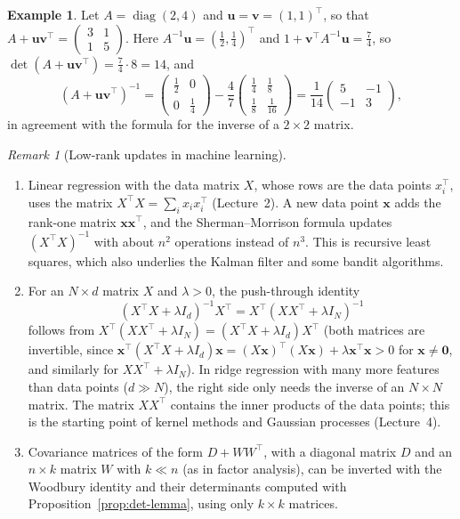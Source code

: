 \documentclass[11pt]{article}
\theoremstyle{definition}
\newtheorem{example}[definition]{Example}
\theoremstyle{plain}
\theoremstyle{remark}
\newtheorem{remark}[definition]{Remark}
\DeclareMathOperator{\diag}{diag}
\begin{document}
\begin{example}\label{ex:sherman-morrison}
    Let $A = \diag(2, 4)$ and $\mathbf{u} = \mathbf{v} = (1, 1)^\top$, so that $A + \mathbf{u}\mathbf{v}^\top = \begin{pmatrix} 3 & 1 \\ 1 & 5 \end{pmatrix}$. Here $A^{-1}\mathbf{u} = (\frac{1}{2}, \frac{1}{4})^\top$ and $1 + \mathbf{v}^\top A^{-1}\mathbf{u} = \frac{7}{4}$, so $\det(A + \mathbf{u}\mathbf{v}^\top) = \frac{7}{4} \cdot 8 = 14$, and
    \[(A + \mathbf{u}\mathbf{v}^\top)^{-1} = \begin{pmatrix} \frac{1}{2} & 0 \\ 0 & \frac{1}{4} \end{pmatrix} - \frac{4}{7}\begin{pmatrix} \frac{1}{4} & \frac{1}{8} \\ \frac{1}{8} & \frac{1}{16} \end{pmatrix} = \frac{1}{14}\begin{pmatrix} 5 & -1 \\ -1 & 3 \end{pmatrix},\]
    in agreement with the formula for the inverse of a $2 \times 2$ matrix.
\end{example}

\begin{remark}[Low-rank updates in machine learning]
    \begin{enumerate}
        \item Linear regression with the data matrix $X$, whose rows are the data points $x_i^\top$, uses the matrix $X^\top X = \sum_i x_ix_i^\top$ (Lecture~2). A new data point $\mathbf{x}$ adds the rank-one matrix $\mathbf{x}\mathbf{x}^\top$, and the Sherman--Morrison formula updates $(X^\top X)^{-1}$ with about $n^2$ operations instead of $n^3$. This is recursive least squares, which also underlies the Kalman filter and some bandit algorithms.
        \item For an $N \times d$ matrix $X$ and $\lambda > 0$, the push-through identity
        \[(X^\top X + \lambda I_d)^{-1}X^\top = X^\top(XX^\top + \lambda I_N)^{-1}\]
        follows from $X^\top(XX^\top + \lambda I_N) = (X^\top X + \lambda I_d)X^\top$ (both matrices are invertible, since $\mathbf{x}^\top(X^\top X + \lambda I_d)\mathbf{x} = (X\mathbf{x})^\top(X\mathbf{x}) + \lambda \mathbf{x}^\top \mathbf{x} > 0$ for $\mathbf{x} \neq \mathbf{0}$, and similarly for $XX^\top + \lambda I_N$). In ridge regression with many more features than data points ($d \gg N$), the right side only needs the inverse of an $N \times N$ matrix. The matrix $XX^\top$ contains the inner products of the data points; this is the starting point of kernel methods and Gaussian processes (Lecture~4).
        \item Covariance matrices of the form $D + WW^\top$, with a diagonal matrix $D$ and an $n \times k$ matrix $W$ with $k \ll n$ (as in factor analysis), can be inverted with the Woodbury identity and their determinants computed with Proposition~\ref{prop:det-lemma}, using only $k \times k$ matrices.
    \end{enumerate}
\end{remark}
\end{document}
